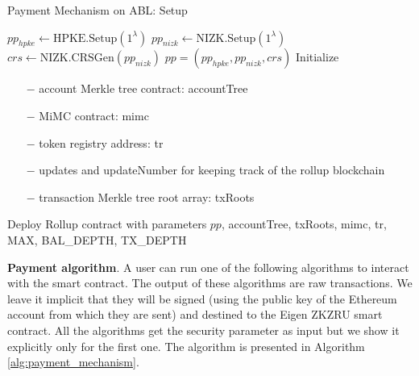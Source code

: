 \documentclass{article}
\begin{document}
\begin{algorithm}
 \caption{Payment Mechanism on ABL: Setup}
    \label{alg:setup}
    \LinesNumbered
    
    $pp_{hpke} \gets \mbox{HPKE.Setup}(1^\lambda)$ \;
    $pp_{nizk} \gets \mbox{NIZK.Setup}(1^\lambda)$ \;
    $crs \gets \mbox{NIZK.CRSGen}(pp_{nizk})$ \;
    $pp = (pp_{hpke}, pp_{nizk}, crs)$ \;
    Initialize {
        \begin{itemize}
            \item[$-$] account Merkle tree contract: accountTree
            \item[$-$] MiMC contract: mimc
            \item[$-$] token registry address: tr
            \item[$-$] updates and updateNumber for keeping track of the rollup blockchain
            \item[$-$] transaction Merkle tree root array: txRoots
        \end{itemize}
    }
    Deploy Rollup contract with parameters $pp$, accountTree, txRoots, mimc, tr, \mbox{MAX}, BAL\_DEPTH, TX\_DEPTH
    
\end{algorithm}

\textbf{Payment algorithm}. A user can run one of the following algorithms to interact with the smart contract. The output of these algorithms are raw transactions. We leave it implicit that they will be signed (using the public key of the Ethereum account from which they are sent) and destined to the Eigen ZKZRU smart contract. All the algorithms get the security parameter as input but we show it explicitly only for the first one. The algorithm is presented in 
Algorithm \ref{alg:payment_mechanism}.
\end{document}
